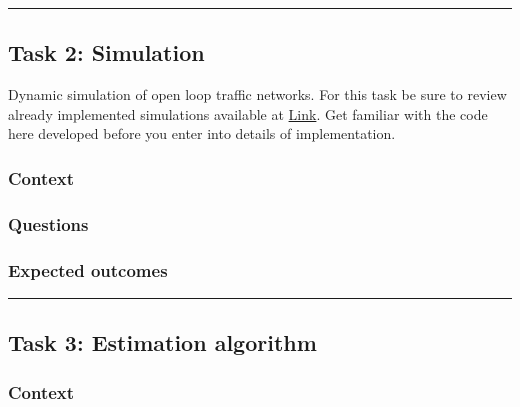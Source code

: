\documentclass[]{book}
\theoremstyle{definition}
\theoremstyle{definition}
\theoremstyle{definition}
\theoremstyle{remark}
\begin{document}
\begin{center}\rule{0.5\linewidth}{\linethickness}\end{center}

\hypertarget{task-2-simulation-1}{%
\subsection*{Task 2: Simulation}\label{task-2-simulation-1}}

Dynamic simulation of open loop traffic networks. For this task be sure
to review already implemented simulations available at
\href{https://github.com/andres-ladino-ifsttar/traffic-macrosimulator}{Link}.
Get familiar with the code here developed before you enter into details
of implementation.

\hypertarget{context-10}{%
\subsubsection*{Context}\label{context-10}}

\hypertarget{questions-9}{%
\subsubsection*{Questions}\label{questions-9}}

\hypertarget{expected-outcomes-9}{%
\subsubsection*{Expected outcomes}\label{expected-outcomes-9}}

\begin{center}\rule{0.5\linewidth}{\linethickness}\end{center}

\hypertarget{task-3-estimation-algorithm}{%
\subsection*{Task 3: Estimation
algorithm}\label{task-3-estimation-algorithm}}

\hypertarget{context-11}{%
\subsubsection*{Context}\label{context-11}}
\end{document}

